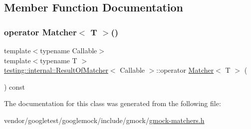 \subsection{Member Function Documentation}
\mbox{\label{classtesting_1_1internal_1_1_result_of_matcher_ab537f63126b81ea991ff369becf7ad7e}} 
\subsubsection{\texorpdfstring{operator Matcher$<$ T $>$()}{operator Matcher< T >()}}
{\footnotesize\ttfamily template$<$typename Callable$>$ \\
template$<$typename T $>$ \\
\hyperlink{classtesting_1_1internal_1_1_result_of_matcher}{testing\+::internal\+::\+Result\+Of\+Matcher}$<$ Callable $>$\+::operator \hyperlink{classtesting_1_1_matcher}{Matcher}$<$ T $>$ (\begin{DoxyParamCaption}{ }\end{DoxyParamCaption}) const\hspace{0.3cm}{\ttfamily [inline]}}



The documentation for this class was generated from the following file\+:\begin{DoxyCompactItemize}
\item 
vendor/googletest/googlemock/include/gmock/\hyperlink{gmock-matchers_8h}{gmock-\/matchers.\+h}\end{DoxyCompactItemize}
